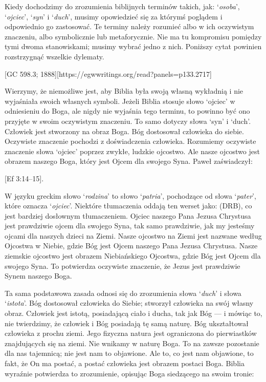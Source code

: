 Kiedy dochodzimy do zrozumienia biblijnych terminów takich, jak: ‘\textit{osoba}’, ‘\textit{ojciec}’, ‘\textit{syn}’ i ‘\textit{duch}’, musimy opowiedzieć się za którymś poglądem i odpowiednio go zastosować. Te terminy należy rozumieć albo w ich oczywistym znaczeniu, albo symbolicznie lub metaforycznie. Nie ma tu kompromisu pomiędzy tymi dwoma stanowiskami; musimy wybrać jedno z nich. Poniższy cytat powinien rozstrzygnąć wszelkie dylematy.

[GC 598.3; 1888][https://egwwritings.org/read?panels=p133.2717]

Wierzymy, że niemożliwe jest, aby Biblia była swoją własną wykładnią i nie wyjaśniała swoich własnych symboli. Jeżeli Biblia stosuje słowo ‘ojciec’ w odniesieniu do Boga, ale nigdy nie wyjaśnia tego terminu, to powinno być ono przyjęte w swoim oczywistym znaczeniu. To samo dotyczy słowa ‘syn’ i ‘duch’. Człowiek jest stworzony na obraz Boga. Bóg dostosował człowieka do siebie. Oczywiste znaczenie pochodzi z doświadczenia człowieka. Rozumiemy oczywiste znaczenie słowa ‘ojciec’ poprzez zwykłe, ludzkie ojcostwo. Ale nasze ojcostwo jest obrazem naszego Boga, który jest Ojcem dla swojego Syna. Paweł zaświadczył:

[Ef 3:14--15].

W języku greckim słowo ‘\textit{rodzina}’ to słowo ‘\textit{patria}’, pochodzące od słowa ‘\textit{pater}’, które oznacza ‘\textit{ojciec}’. Niektóre tłumaczenia oddają ten werset jako:  (DRB), co jest bardziej dosłownym tłumaczeniem. Ojciec naszego Pana Jezusa Chrystusa jest prawdziwie ojcem dla swojego Syna, tak samo prawdziwie, jak my jesteśmy ojcami dla naszych dzieci na Ziemi. Nasze ojcostwo na Ziemi jest nazwane według Ojcostwa w Niebie, gdzie Bóg jest Ojcem naszego Pana Jezusa Chrystusa. Nasze ziemskie ojcostwo jest obrazem Niebiańskiego Ojcostwa, gdzie Bóg jest Ojcem dla swojego Syna. To potwierdza oczywiste znaczenie, że Jezus jest prawdziwie Synem naszego Boga.

Ta sama podstawowa zasada odnosi się do zrozumienia słowa ‘\textit{duch}’ i słowa ‘\textit{istota}’. Bóg dostosował człowieka do Siebie; stworzył człowieka na swój własny obraz. Człowiek jest istotą, posiadającą ciało i ducha, tak jak Bóg — i mówiąc to, nie twierdzimy, że człowiek i Bóg posiadają tę samą naturę. Bóg ukształtował człowieka z prochu ziemi. Jego fizyczna natura jest ograniczona do pierwiastków znajdujących się na ziemi. Nie wnikamy w naturę Boga. To na zawsze pozostanie dla nas tajemnicą; nie jest nam to objawione. Ale to, co jest nam objawione, to fakt, że On ma postać, a postać człowieka jest obrazem postaci Boga. Biblia wyraźnie potwierdza to zrozumienie, opisując Boga siedzącego na swoim tronie:

